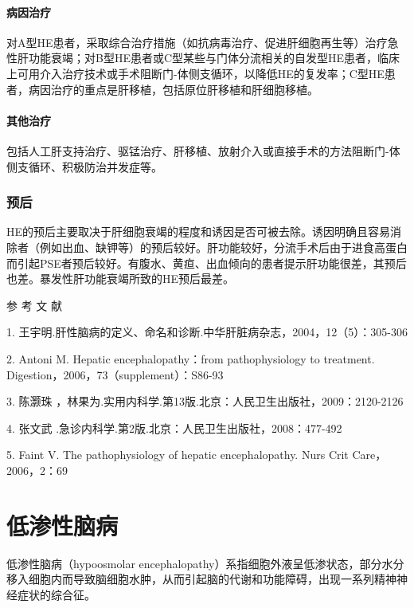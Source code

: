 \subsubsection{病因治疗}

对A型HE患者，采取综合治疗措施（如抗病毒治疗、促进肝细胞再生等）治疗急性肝功能衰竭；对B型HE患者或C型某些与门体分流相关的自发型HE患者，临床上可用介入治疗技术或手术阻断门-体侧支循环，以降低HE的复发率；C型HE患者，病因治疗的重点是肝移植，包括原位肝移植和肝细胞移植。

\subsubsection{其他治疗}

包括人工肝支持治疗、驱锰治疗、肝移植、放射介入或直接手术的方法阻断门-体侧支循环、积极防治并发症等。

\subsection{预后}

HE的预后主要取决于肝细胞衰竭的程度和诱因是否可被去除。诱因明确且容易消除者（例如出血、缺钾等）的预后较好。肝功能较好，分流手术后由于进食高蛋白而引起PSE者预后较好。有腹水、黄疸、出血倾向的患者提示肝功能很差，其预后也差。暴发性肝功能衰竭所致的HE预后最差。
\protect\hypertarget{text00102.html}{}{}

\hypertarget{text00102.htmlux5cux23CHP4-3-8}{}
参 考 文 献

1.
王宇明.肝性脑病的定义、命名和诊断.中华肝脏病杂志，2004，12（5）：305-306

2. Antoni M. Hepatic encephalopathy：from pathophysiology to treatment.
Digestion，2006，73（supplement）：S86-93

3. 陈灏珠
，林果为.实用内科学.第13版.北京：人民卫生出版社，2009：2120-2126

4. 张文武 .急诊内科学.第2版.北京：人民卫生出版社，2008：477-492

5. Faint V. The pathophysiology of hepatic encephalopathy. Nurs Crit
Care，2006，2：69

\protect\hypertarget{text00103.html}{}{}

\chapter{低渗性脑病}

低渗性脑病（hypoosmolar
encephalopathy）系指细胞外液呈低渗状态，部分水分移入细胞内而导致脑细胞水肿，从而引起脑的代谢和功能障碍，出现一系列精神神经症状的综合征。

